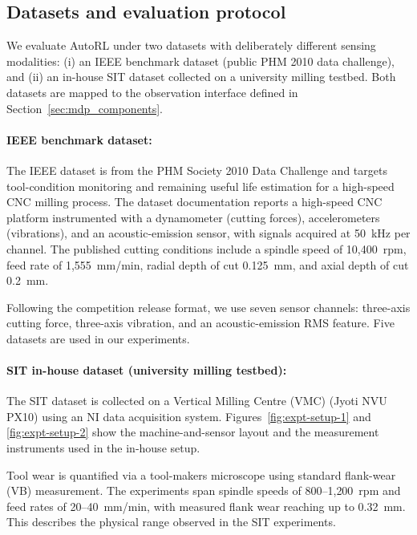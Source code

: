 \documentclass[sn-basic]{sn-jnl} %
\begin{document}
\subsection{Datasets and evaluation protocol} \label{sec:experiment} 

We evaluate AutoRL under two datasets with deliberately different sensing modalities: (i) an IEEE benchmark dataset (public PHM 2010 data challenge), and (ii) an in-house SIT dataset collected on a university milling testbed. Both datasets are mapped to the observation interface defined in Section~\ref{sec:mdp_components}.%

\paragraph{IEEE benchmark dataset:}
The IEEE dataset \cite{PHMdata2010} is from the PHM Society 2010 Data Challenge and targets tool-condition monitoring and remaining useful life estimation for a high-speed CNC milling process. The dataset documentation reports a high-speed CNC platform instrumented with a dynamometer (cutting forces), accelerometers (vibrations), and an acoustic-emission sensor, with signals acquired at 50~kHz per channel. The published cutting conditions include a spindle speed of 10{,}400~rpm, feed rate of 1{,}555~mm/min, radial depth of cut 0.125~mm, and axial depth of cut 0.2~mm.

Following the competition release format, we use seven sensor channels: three-axis cutting force, three-axis vibration, and an acoustic-emission RMS feature. Five datasets are used in our experiments.

\paragraph{SIT in-house dataset (university milling testbed):}
The SIT dataset is collected on a Vertical Milling Centre (VMC) (Jyoti NVU PX10) using an NI data acquisition system. Figures~\ref{fig:expt-setup-1} and \ref{fig:expt-setup-2} show the machine-and-sensor layout and the measurement instruments used in the in-house setup.

Tool wear is quantified via a tool-makers microscope using standard flank-wear (VB) measurement. The experiments span spindle speeds of 800--1{,}200~rpm and feed rates of 20--40~mm/min, with measured flank wear reaching up to 0.32~mm. This describes the physical range observed in the SIT experiments.
\end{document}
